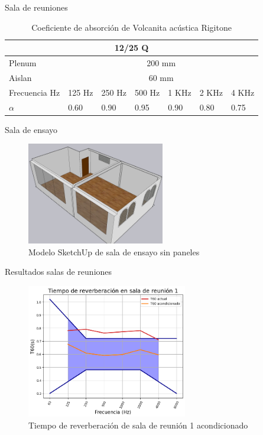 \documentclass{sintefbeamer}
\begin{document}
\begin{frame}{Sala de reuniones}
    \begin{table}[H]
    \centering
    \begin{tabular}{|lllllll|}
    \hline
    \multicolumn{7}{|c|}{\textbf{12/25 Q}} \\ \hline
    \multicolumn{1}{|l|}{Plenum} & \multicolumn{6}{c|}{200 mm} \\ \hline
    \multicolumn{1}{|l|}{Aislan} & \multicolumn{6}{c|}{60  mm} \\ \hline
    \multicolumn{1}{|l|}{Frecuencia Hz} & \multicolumn{1}{l|}{125 Hz} & \multicolumn{1}{l|}{250 Hz} & \multicolumn{1}{l|}{500 Hz} & \multicolumn{1}{l|}{1 KHz} & \multicolumn{1}{l|}{2 KHz} & 4 KHz \\ \hline
    \multicolumn{1}{|l|}{$\alpha$} & \multicolumn{1}{l|}{0.60} & \multicolumn{1}{l|}{0.90} & \multicolumn{1}{l|}{0.95} & \multicolumn{1}{l|}{0.90} & \multicolumn{1}{l|}{0.80} & 0.75 \\ \hline
    \end{tabular}
    \caption{Coeficiente de absorción de Volcanita acústica Rigitone}
    \end{table}  

\end{frame}
\begin{frame}{Sala de ensayo}
    \begin{figure}[H]
        \centering
        \includegraphics[width=6cm]{images/Propuesta/Sala ensayo sin paneles.jpg}
        \caption{Modelo SketchUp de sala de ensayo sin paneles}
    \end{figure}
\end{frame}
\begin{frame}{Resultados salas de reuniones}
    \begin{figure}
        \centering
        \includegraphics[width=7cm]{images/DIN/DIN sala reunion 1 comparacion.png}
        \caption{Tiempo de reverberación de sala de reunión 1 acondicionado}
        \label{fig:din sala 1 acond}
    \end{figure}
\end{frame}
\end{document}
